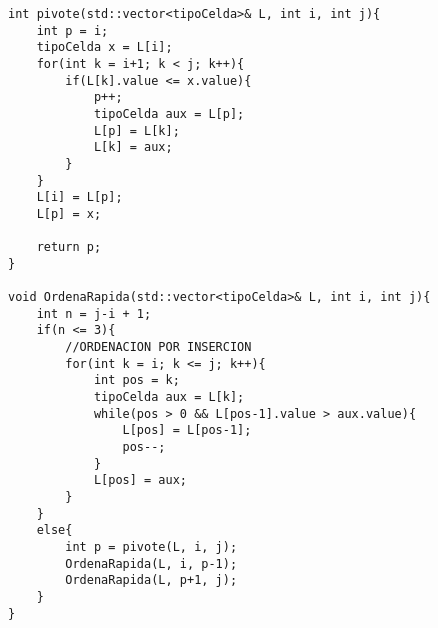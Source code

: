 \begin{lstlisting}
int pivote(std::vector<tipoCelda>& L, int i, int j){
    int p = i;
    tipoCelda x = L[i];
    for(int k = i+1; k < j; k++){
        if(L[k].value <= x.value){
            p++;
            tipoCelda aux = L[p];
            L[p] = L[k];
            L[k] = aux;
        }
    }
    L[i] = L[p];
    L[p] = x;

    return p;
}

void OrdenaRapida(std::vector<tipoCelda>& L, int i, int j){
    int n = j-i + 1;
    if(n <= 3){
        //ORDENACION POR INSERCION
        for(int k = i; k <= j; k++){
            int pos = k;
            tipoCelda aux = L[k];
            while(pos > 0 && L[pos-1].value > aux.value){
                L[pos] = L[pos-1];
                pos--;
            }
            L[pos] = aux;
        }
    }
    else{
        int p = pivote(L, i, j);
        OrdenaRapida(L, i, p-1);
        OrdenaRapida(L, p+1, j);
    }
}
\end{lstlisting}
